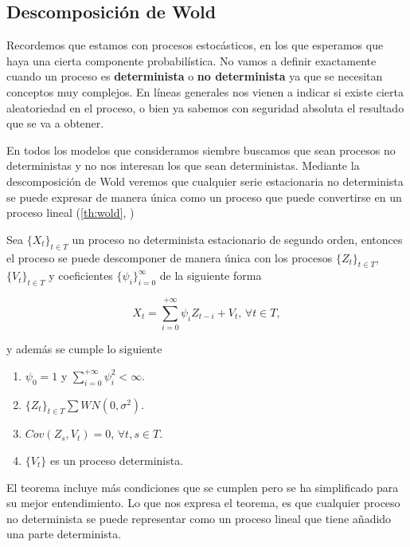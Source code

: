 \subsection{Descomposición de Wold}

Recordemos que estamos con procesos estocásticos, en los que esperamos que haya una cierta componente probabilística. No vamos a definir exactamente cuando un proceso es \textbf{determinista} o \textbf{no determinista} ya que se necesitan conceptos muy complejos. En líneas generales nos vienen a indicar si existe cierta aleatoriedad en el proceso, o bien ya sabemos con seguridad absoluta el resultado que se va a obtener.

En todos los modelos que consideramos siembre buscamos que sean procesos no deterministas y no nos interesan los que sean deterministas. Mediante la descomposición de Wold veremos que cualquier serie estacionaria no determinista se puede expresar de manera única como un proceso que puede convertirse en un proceso lineal (\autoref{th:wold}, \cite{wold1938decomposition})

\begin{teorema}
  Sea $\{X_t\}_{t \in T}$ un proceso no determinista estacionario de segundo orden, entonces el proceso se puede descomponer de manera única con los procesos $\{Z_t\}_{t \in T}$, $\{V_t\}_{t \in T}$ y coeficientes $\{\psi_i\}_{i = 0}^{\infty}$ de la siguiente forma

  $$ X_t = \sum \limits^{+\infty}_{i = 0} \psi_i Z_{t - i} + V_t, \, \forall t \in T,$$

  y además se cumple lo siguiente

  \begin{enumerate}
    \item $\psi_0 = 1$ y $\sum^{+\infty}_{i = 0} \psi^2_i < \infty$.
    \item $\{Z_t\}_{t \in T} \sum WN(0, \sigma^2)$.
    \item $Cov(Z_s, V_t) = 0$, $\forall t,s \in T$.
    \item $\{V_t\}$ es un proceso determinista.
  \end{enumerate}
  \label{th:wold}
\end{teorema}

El teorema incluye más condiciones que se cumplen pero se ha simplificado para su mejor entendimiento. Lo que nos expresa el teorema, es que cualquier proceso no determinista se puede representar como un proceso lineal que tiene añadido una parte determinista.

